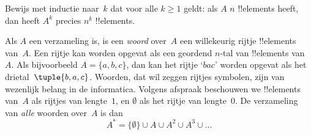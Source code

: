 \documentclass[../../../include/open-logic-section]{subfiles}
\begin{document}
\begin{prob}
Bewijs met inductie naar~$k$ dat voor alle $k \ge 1$ geldt: als $A$
$n$ !!{element}s heeft, dan heeft $A^k$ precies $n^k$ !!{element}s.
\end{prob}

\begin{ex}
Als $A$ een verzameling is, is een \emph{woord} over~$A$ een
willekeurig rijtje !!{element}s van~$A$. Een rijtje kan worden opgevat
als een geordend $n$-tal van !!{element}s van~$A$. Als bijvoorbeeld $A =
\{a, b, c\}$, dan kan het rijtje ‘$bac$’ worden opgevat als het
drietal~$\tuple{b, a, c}$. Woorden, dat wil zeggen rijtjes symbolen,
zijn van wezenlijk belang in de informatica. Volgens afspraak
beschouwen we !!{element}s van~$A$ als rijtjes van lengte~$1$, en
$\emptyset$ als het rijtje van lengte~$0$. De verzameling van
\emph{alle} woorden over~$A$ is dan
\[
A^* = \{\emptyset\} \cup A \cup A^2 \cup A^3 \cup \dots
\]
\end{ex}
\end{document}
